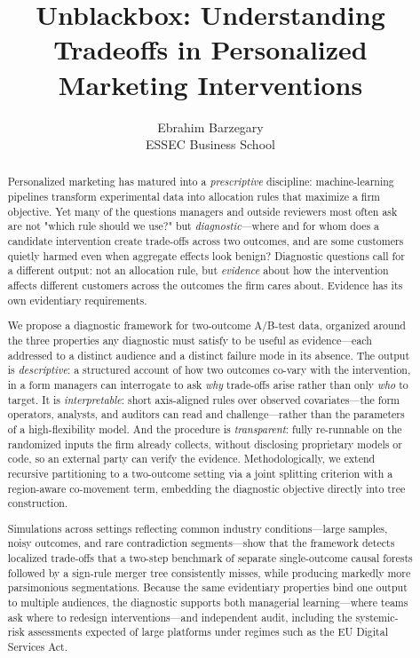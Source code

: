 \documentclass[11pt,letterpaper,english]{article}
\theoremstyle{definition}
\theoremstyle{definition}
\begin{document}
\title{Unblackbox: Understanding Tradeoffs in Personalized Marketing Interventions}


\author{
       Ebrahim Barzegary \\
        ESSEC Business School\\
 }

\thispagestyle{empty}

\date{}
\maketitle

\begin{abstract} 

Personalized marketing has matured into a \emph{prescriptive} discipline: machine-learning pipelines transform experimental data into allocation rules that maximize a firm objective. Yet many of the questions managers and outside reviewers most often ask are not "which rule should we use?" but \emph{diagnostic}---where and for whom does a candidate intervention create trade-offs across two outcomes, and are some customers quietly harmed even when aggregate effects look benign? Diagnostic questions call for a different output: not an allocation rule, but \emph{evidence} about how the intervention affects different customers across the outcomes the firm cares about. Evidence has its own evidentiary requirements.

We propose a diagnostic framework for two-outcome A/B-test data, organized around the three properties any diagnostic must satisfy to be useful as evidence---each addressed to a distinct audience and a distinct failure mode in its absence. The output is \emph{descriptive}: a structured account of how two outcomes co-vary with the intervention, in a form managers can interrogate to ask \emph{why} trade-offs arise rather than only \emph{who} to target. It is \emph{interpretable}: short axis-aligned rules over observed covariates---the form operators, analysts, and auditors can read and challenge---rather than the parameters of a high-flexibility model. And the procedure is \emph{transparent}: fully re-runnable on the randomized inputs the firm already collects, without disclosing proprietary models or code, so an external party can verify the evidence. Methodologically, we extend recursive partitioning to a two-outcome setting via a joint splitting criterion with a region-aware co-movement term, embedding the diagnostic objective directly into tree construction.

Simulations across settings reflecting common industry conditions---large samples, noisy outcomes, and rare contradiction segments---show that the framework detects localized trade-offs that a two-step benchmark of separate single-outcome causal forests followed by a sign-rule merger tree consistently misses, while producing markedly more parsimonious segmentations. Because the same evidentiary properties bind one output to multiple audiences, the diagnostic supports both managerial learning---where teams ask where to redesign interventions---and independent audit, including the systemic-risk assessments expected of large platforms under regimes such as the EU Digital Services Act.
\vspace{5mm}


\end{abstract}
\end{document}
